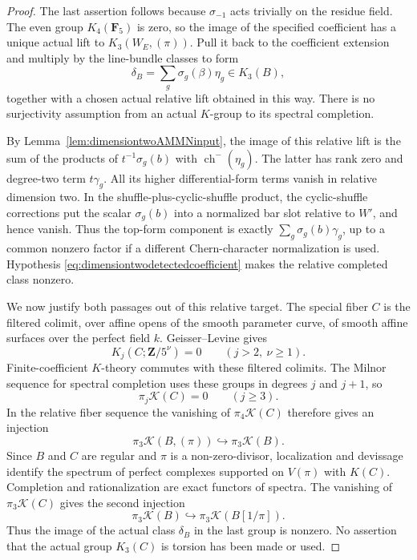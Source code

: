 \documentclass[11pt,a4paper]{article}
\theoremstyle{remark}
\begin{document}
\begin{proof}
The last assertion follows because $\sigma_{-1}$ acts trivially
on the residue field. The even group $K_4(\mathbf F_5)$ is zero,
so the image of the specified coefficient has a unique actual
lift to $K_3(W_E,(\pi))$. Pull it back to the coefficient extension and
multiply by the line-bundle classes to form
\[
 \delta_B=\sum_g\sigma_g(\beta)\eta_g\in K_3(B),
\]
together with a chosen actual relative lift obtained in this way.
There is no surjectivity assumption from an actual $K$-group to
its spectral completion.

By Lemma~\ref{lem:dimensiontwoAMMNinput}, the image of this
relative lift is the sum of the products of
$t^{-1}\sigma_g(b)$ with $\operatorname{ch}^-(\eta_g)$.
The latter has rank zero and degree-two term $t\gamma_g$.
All its higher differential-form terms vanish in relative
dimension two. In the shuffle-plus-cyclic-shuffle product, the
cyclic-shuffle corrections put the scalar $\sigma_g(b)$ into a
normalized bar slot relative to $W'$, and hence vanish.
Thus the top-form component is exactly
$\sum_g\sigma_g(b)\gamma_g$, up to a common nonzero factor if a
different Chern-character normalization is used. Hypothesis
\eqref{eq:dimensiontwodetectedcoefficient} makes the relative
completed class nonzero.

We now justify both passages out of this relative target.
The special fiber $C$ is the filtered colimit, over affine opens
of the smooth parameter curve, of smooth affine surfaces over
the perfect field $k$. Geisser--Levine
\cite[Theorem~8.4]{GeisserLevineCharP} gives
\[
 K_j(C;\mathbf Z/5^\nu)=0\qquad(j>2,\ \nu\geq1).
\]
Finite-coefficient $K$-theory commutes with these filtered
colimits. The Milnor sequence for spectral completion uses
these groups in degrees $j$ and $j+1$, so
\[
 \pi_j\mathcal K(C)=0\qquad(j\geq3).
\]
In the relative fiber sequence the vanishing of
$\pi_4\mathcal K(C)$ therefore gives an injection
\begin{equation}
 \pi_3\mathcal K(B,(\pi))\hookrightarrow\pi_3\mathcal K(B).
\label{eq:dimensiontworelativeinjection}
\end{equation}
Since $B$ and $C$ are regular and $\pi$ is a non-zero-divisor,
localization and devissage identify the spectrum of perfect
complexes supported on $V(\pi)$ with $K(C)$. Completion and
rationalization are exact functors of spectra. The vanishing
of $\pi_3\mathcal K(C)$ gives the second injection
\begin{equation}
 \pi_3\mathcal K(B)\hookrightarrow\pi_3\mathcal K(B[1/\pi]).
\label{eq:dimensiontwogenericinjection}
\end{equation}
Thus the image of the actual class $\delta_B$ in the last group
is nonzero. No assertion that the actual group $K_3(C)$ is
torsion has been made or used.


\end{proof}
\end{document}
